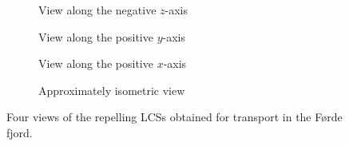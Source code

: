 \begin{figure}[htpb]
    \centering
    \vspace{10.0pt}

    \begin{subfigure}[b]{0.475\textwidth}
        \centering
        \caption[]{{\small View along the negative $z$-axis}}
        \label{fig:fjord_lcss_z}
    \end{subfigure}
    \begin{subfigure}[b]{0.475\textwidth}
        \centering
        \caption[]{{\small View along the positive $y$-axis}}
        \label{fig:fjord_lcss_y}
    \end{subfigure}

    \begin{subfigure}[b]{0.475\textwidth}
        \centering
        \caption[]{{\small View along the positive $x$-axis}}
        \label{fig:fjord_lcss_x}
    \end{subfigure}
    \begin{subfigure}[b]{0.475\textwidth}
        \centering
        \caption[]{{\small Approximately isometric view}}
        \label{fig:fjord_lcss_isometric}
    \end{subfigure}
    \caption[Four views of the repelling LCSs obtained for transport in the
    Førde fjord]
    {
        Four views of the repelling LCSs obtained for transport in the Førde
        fjord.
}
    \label{fig:fjord_lcss}
\end{figure}

